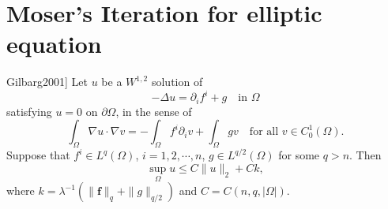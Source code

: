 \section{Moser's Iteration for elliptic equation}
\begin{theorem}[\cite[Theorem~8.15]{Gilbarg2001}]
	Let $u$ be a $W^{1,2}$ solution of 
	\[
		-\Delta u = \partial_if^i + g\quad\text{in }\Omega
	\]
	satisfying $u=0$ on $\partial\Omega$,
	in the sense of
	\begin{equation}\label{eq: formula of weak solutions}
		\int_\Omega \nabla u\cdot\nabla v = - \int_\Omega f^i\partial_iv + \int_\Omega gv 
		\quad\text{for all }v\in C^1_0(\Omega).
	\end{equation}
	Suppose that $f^i\in L^q(\Omega)$, $i=1,2,\cdots,n$, $g\in L^{q/2}(\Omega)$ for some $q>n$.
	Then 
	\[
		\sup_\Omega u \leq C\|u\|_2 + Ck,
	\]
	where $k=\lambda^{-1}(\|\mathbf{f}\|_q + \|g\|_{q/2})$ 
	and $C=C(n,q,|\Omega|)$.
\end{theorem}
